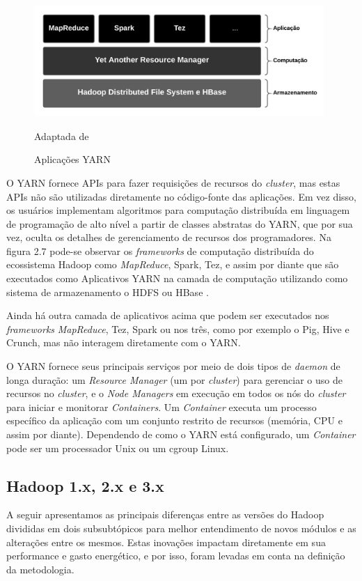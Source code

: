 \begin{figure}[htp]
    \centering
    \includegraphics[width=11cm]{2-fundam/Figura_5.jpg}
    \caption{Aplicações YARN}
    Adaptada de \cite{white2015hadoop}
    \label{fig:YARNApplication}
\end{figure}

O YARN fornece APIs para fazer requisições de recursos do \emph{cluster}, mas estas APIs não são utilizadas diretamente no código-fonte das aplicações. Em vez disso, os usuários implementam algoritmos para computação distribuída em linguagem de programação de alto nível a partir de classes abstratas do YARN, que por sua vez, oculta os detalhes de gerenciamento de recursos dos programadores. Na figura 2.7 pode-se observar os \emph{frameworks} de computação distribuída do ecossistema Hadoop como \emph{MapReduce}, Spark, Tez, e assim por diante que são executados como Aplicativos YARN na camada de computação utilizando como sistema de armazenamento o HDFS ou HBase \cite{white2015hadoop}.

Ainda há outra camada de aplicativos acima que podem ser executados nos \emph{frameworks} \emph{MapReduce}, Tez, Spark ou nos três, como por exemplo o Pig, Hive e Crunch, mas não interagem diretamente com o YARN.

O YARN fornece seus principais serviços por meio de dois tipos de \emph{daemon} de longa duração: um \emph{Resource Manager} (um por \emph{cluster}) para gerenciar o uso de recursos no \emph{cluster}, e o \emph{Node Managers} em execução em todos os nós do \emph{cluster} para iniciar e monitorar \emph{Containers}. Um \emph{Container} executa um processo específico da aplicação com um conjunto restrito de recursos (memória, CPU e assim por diante). Dependendo de como o YARN está configurado, um \emph{Container} pode ser um processador Unix ou um cgroup Linux.


\subsection{Hadoop 1.x, 2.x e 3.x}

A seguir apresentamos as principais diferenças entre as versões do Hadoop divididas em dois subsubtópicos para melhor entendimento de novos módulos e as alterações entre os mesmos. Estas inovações impactam diretamente em sua performance e gasto energético, e por isso, foram levadas em conta na definição da metodologia.

